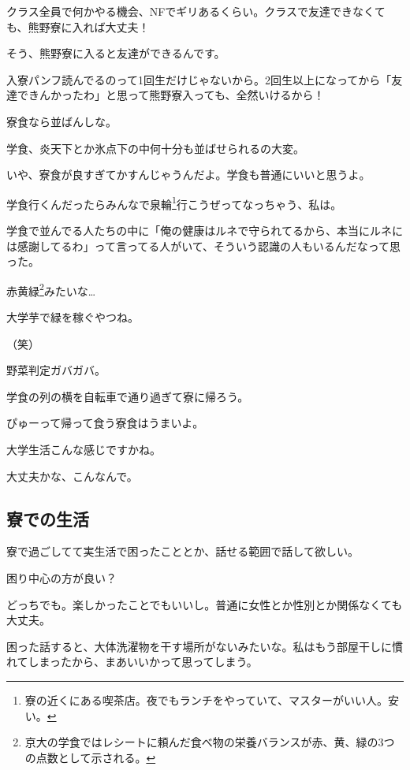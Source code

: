 \begin{multicols}{2}
  クラス全員で何かやる機会、NFでギリあるくらい。クラスで友達できなくても、熊野寮に入れば大丈夫！

  そう、熊野寮に入ると友達ができるんです。

  入寮パンフ読んでるのって1回生だけじゃないから。2回生以上になってから「友達できんかったわ」と思って熊野寮入っても、全然いけるから！

  寮食なら並ばんしな。

  学食、炎天下とか氷点下の中何十分も並ばせられるの大変。

  いや、寮食が良すぎてかすんじゃうんだよ。学食も普通にいいと思うよ。

  学食行くんだったらみんなで泉輪\footnote{寮の近くにある喫茶店。夜でもランチをやっていて、マスターがいい人。安い。}行こうぜってなっちゃう、私は。

  学食で並んでる人たちの中に「俺の健康はルネで守られてるから、本当にルネには感謝してるわ」って言ってる人がいて、そういう認識の人もいるんだなって思った。

  赤黄緑\footnote{京大の学食ではレシートに頼んだ食べ物の栄養バランスが赤、黄、緑の3つの点数として示される。}みたいな…

  大学芋で緑を稼ぐやつね。

  （笑）

  野菜判定ガバガバ。

  学食の列の横を自転車で通り過ぎて寮に帰ろう。

  ぴゅーって帰って食う寮食はうまいよ。

  大学生活こんな感じですかね。

  大丈夫かな、こんなんで。



  \subsection{寮での生活}



  寮で過ごしてて実生活で困ったこととか、話せる範囲で話して欲しい。

  困り中心の方が良い？

  どっちでも。楽しかったことでもいいし。普通に女性とか性別とか関係なくても大丈夫。

  困った話すると、大体洗濯物を干す場所がないみたいな。私はもう部屋干しに慣れてしまったから、まあいいかって思ってしまう。


\end{multicols}
